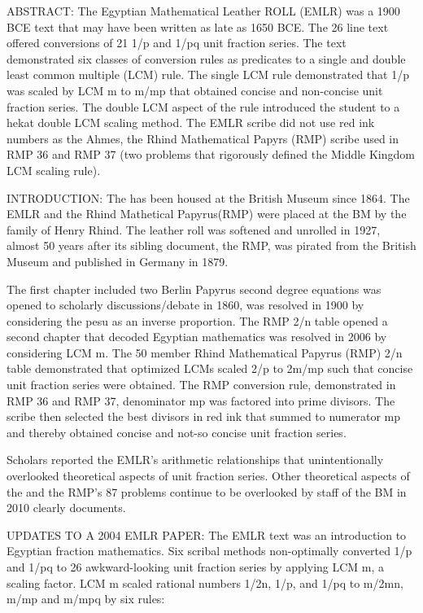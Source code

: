 \documentclass[12pt]{article}
\begin{document}
ABSTRACT: The Egyptian Mathematical Leather ROLL (EMLR) was a 1900 BCE text that may have been written as late as 1650 BCE. The 26 line text offered conversions of 21 1/p and 1/pq unit fraction series. The text demonstrated six classes of conversion rules as predicates to a single and double least common multiple (LCM) rule. The single LCM rule demonstrated that 1/p was scaled by LCM m to m/mp that obtained concise and non-concise unit fraction series. The double LCM aspect of the rule introduced the student to a hekat double LCM scaling method. 
The EMLR scribe did not use red ink numbers as the Ahmes, the Rhind Mathematical Papyrs (RMP) scribe used in RMP 36 and RMP 37 (two problems that rigorously defined the Middle Kingdom LCM scaling rule).

INTRODUCTION: The  has been housed at the British Museum since 1864. The EMLR and the Rhind Mathetical Papyrus(RMP) were placed at the BM by the family of Henry Rhind. The leather roll was softened and unrolled in 1927, almost 50 years after its sibling document, the RMP, was pirated from the British Museum and published in Germany in 1879. 

The first chapter included two Berlin Papyrus second degree equations was opened to scholarly discussions/debate in 1860, was resolved in 1900 by considering the pesu as an inverse proportion. The RMP 2/n table opened a second chapter that decoded Egyptian mathematics was resolved in 2006 by considering LCM m. The 50 member Rhind Mathematical Papyrus (RMP) 2/n table demonstrated that optimized LCMs scaled 2/p to 2m/mp such that concise unit fraction series were obtained. The RMP conversion rule, demonstrated in RMP 36 and RMP 37, denominator mp was factored into prime divisors. The scribe then selected the best divisors in red ink that summed to numerator mp and thereby obtained concise and not-so concise unit fraction series. 

Scholars reported the EMLR's arithmetic relationships that unintentionally overlooked theoretical aspects of unit fraction series. Other theoretical aspects of the  and the RMP's 87 problems continue to be overlooked by staff of the BM in 2010   clearly documents.

UPDATES TO A 2004 EMLR PAPER: The EMLR text was an introduction to Egyptian fraction mathematics. Six scribal methods non-optimally converted 1/p and 1/pq to 26 awkward-looking unit fraction series by applying LCM m, a scaling factor. LCM m scaled rational numbers 1/2n, 1/p, and 1/pq to m/2mn, m/mp and m/mpq by six rules:
\end{document}
